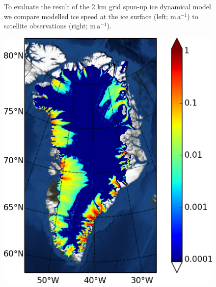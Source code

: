 \documentclass[gmd]{copernicus}   %
\begin{document}
\begin{figure}[ht]
\caption{To evaluate the result of the 2 km grid spun-up ice dynamical model we compare modelled ice speed at the ice surface (left; $\mathrm{m}\,\mathrm{a}^{-1}$) to satellite observations (right; $\mathrm{m}\,\mathrm{a}^{-1}$).}
\label{fig:Greenspinupeval}
\end{figure}

\begin{figure}[ht]
\mbox{\includegraphics[height=\grnht,keepaspectratio=true]{g2km-init-bmelt} \,
}
\end{figure}
\end{document}
